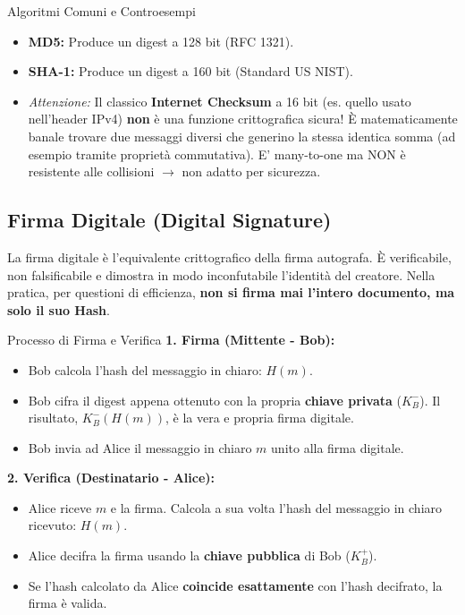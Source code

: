 \documentclass[a4paper,12pt]{report}
\begin{document}
\begin{notebox}{Algoritmi Comuni e Controesempi}
\begin{itemize}
    \item \textbf{MD5:} Produce un digest a 128 bit (RFC 1321).
    \item \textbf{SHA-1:} Produce un digest a 160 bit (Standard US NIST). 
    \item \textit{Attenzione:} Il classico \textbf{Internet Checksum} a 16 bit (es. quello usato nell'header IPv4) \textbf{non} è una funzione crittografica sicura! È matematicamente banale trovare due messaggi diversi che generino la stessa identica somma (ad esempio tramite proprietà commutativa). E' many-to-one ma NON \`e resistente alle
collisioni $\to$ non adatto per sicurezza. 
\end{itemize}
\end{notebox}

\newpage
\subsection{Firma Digitale (Digital Signature)}
La firma digitale è l'equivalente crittografico della firma autografa. È verificabile, non falsificabile e dimostra in modo inconfutabile l'identità del creatore. 
Nella pratica, per questioni di efficienza, \textbf{non si firma mai l'intero documento, ma solo il suo Hash}.

\begin{esempiobox}{Processo di Firma e Verifica}
\textbf{1. Firma (Mittente - Bob):}
\begin{itemize}
    \item Bob calcola l'hash del messaggio in chiaro: $H(m)$.
    \item Bob cifra il digest appena ottenuto con la propria \textbf{chiave privata} ($K_B^-$). Il risultato, $K_B^-(H(m))$, è la vera e propria firma digitale.
    \item Bob invia ad Alice il messaggio in chiaro $m$ unito alla firma digitale.
\end{itemize}

\textbf{2. Verifica (Destinatario - Alice):}
\begin{itemize}
    \item Alice riceve $m$ e la firma. Calcola a sua volta l'hash del messaggio in chiaro ricevuto: $H(m)$.
    \item Alice decifra la firma usando la \textbf{chiave pubblica} di Bob ($K_B^+$).
    \item Se l'hash calcolato da Alice \textbf{coincide esattamente} con l'hash decifrato, la firma è valida.
\end{itemize}
\end{esempiobox}
\end{document}
